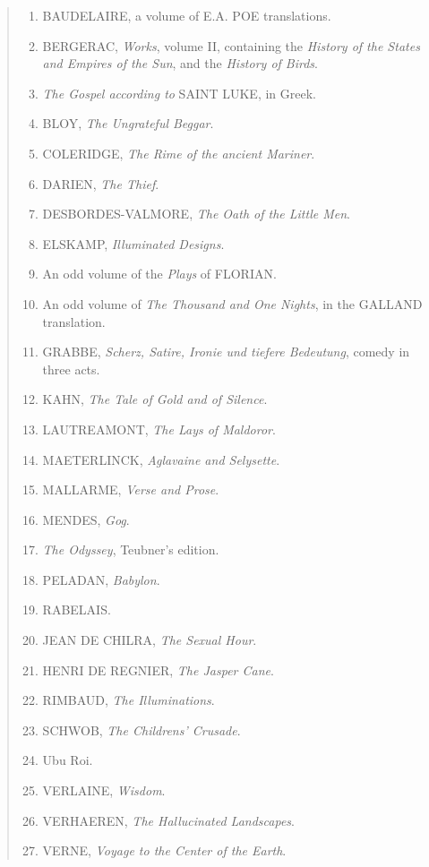 \begin{quotation}
  \begin{enumerate}
    \item BAUDELAIRE, a volume of E.A. POE translations.
    \item BERGERAC, \textit{Works}, volume II, containing the \textit{History of the States and Empires of the Sun}, and the \textit{History of Birds}.
    \item \textit{The Gospel according to} SAINT LUKE, in Greek.
    \item BLOY, \textit{The Ungrateful Beggar}.
    \item COLERIDGE, \textit{The Rime of the ancient Mariner}.
    \item DARIEN, \textit{The Thief}.
    \item DESBORDES-VALMORE, \textit{The Oath of the Little Men}.
    \item ELSKAMP, \textit{Illuminated Designs}.
    \item An odd volume of the \textit{Plays} of FLORIAN\@.
    \item An odd volume of \textit{The Thousand and One Nights}, in the GALLAND translation.
    \item GRABBE, \textit{Scherz, Satire, Ironie und tiefere Bedeutung}, comedy in three acts.
    \item KAHN, \textit{The Tale of Gold and of Silence}.
    \item LAUTREAMONT, \textit{The Lays of Maldoror}.
    \item MAETERLINCK, \textit{Aglavaine and Selysette}.
    \item MALLARME, \textit{Verse and Prose}.
    \item MENDES, \textit{Gog}.
    \item \textit{The Odyssey}, Teubner's edition.
    \item PELADAN, \textit{Babylon}.
    \item RABELAIS\@.
    \item JEAN DE CHILRA, \textit{The Sexual Hour}.
    \item HENRI DE REGNIER, \textit{The Jasper Cane}.
    \item RIMBAUD, \textit{The Illuminations}.
    \item SCHWOB, \textit{The Childrens' Crusade}.
    \item Ubu Roi.
    \item VERLAINE, \textit{Wisdom}.
    \item VERHAEREN, \textit{The Hallucinated Landscapes}.
    \item VERNE, \textit{Voyage to the Center of the Earth}.
  \end{enumerate}
\end{quotation}


